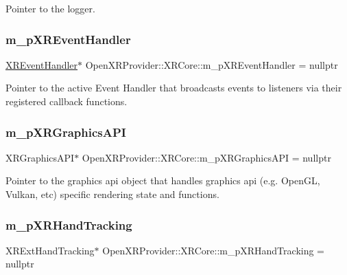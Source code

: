 Pointer to the logger. 

\mbox{\label{class_open_x_r_provider_1_1_x_r_core_a71287a3895f32191616d9e9baec5052b}} 
\subsubsection{\texorpdfstring{m\_pXREventHandler}{m\_pXREventHandler}}
{\footnotesize\ttfamily \mbox{\hyperlink{class_open_x_r_provider_1_1_x_r_event_handler}{X\+R\+Event\+Handler}}$\ast$ Open\+X\+R\+Provider\+::\+X\+R\+Core\+::m\+\_\+p\+X\+R\+Event\+Handler = nullptr\hspace{0.3cm}{\ttfamily [private]}}



Pointer to the active Event Handler that broadcasts events to listeners via their registered callback functions. 

\mbox{\label{class_open_x_r_provider_1_1_x_r_core_a93b6c87c04372c24bd7d2cf1b1e72f41}} 
\subsubsection{\texorpdfstring{m\_pXRGraphicsAPI}{m\_pXRGraphicsAPI}}
{\footnotesize\ttfamily X\+R\+Graphics\+A\+PI$\ast$ Open\+X\+R\+Provider\+::\+X\+R\+Core\+::m\+\_\+p\+X\+R\+Graphics\+A\+PI = nullptr\hspace{0.3cm}{\ttfamily [private]}}



Pointer to the graphics api object that handles graphics api (e.\+g. Open\+GL, Vulkan, etc) specific rendering state and functions. 

\mbox{\label{class_open_x_r_provider_1_1_x_r_core_af446de6c1cdd7c4bffa074b8ded9cae4}} 
\subsubsection{\texorpdfstring{m\_pXRHandTracking}{m\_pXRHandTracking}}
{\footnotesize\ttfamily X\+R\+Ext\+Hand\+Tracking$\ast$ Open\+X\+R\+Provider\+::\+X\+R\+Core\+::m\+\_\+p\+X\+R\+Hand\+Tracking = nullptr\hspace{0.3cm}{\ttfamily [private]}}

